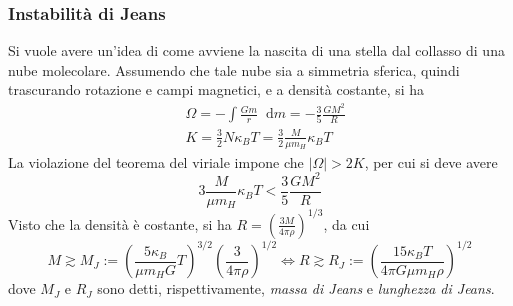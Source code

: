 \documentclass[11pt, a4paper]{scrartcl}
\theoremstyle{style}
\theoremstyle{style1}
\newcommand{\dd}{\mathop{}\!\mathrm{d}}
\numberwithin{equation}{subsection}
\begin{document}
\subsubsection{Instabilit\`a di Jeans}
Si vuole avere un'idea di come avviene la nascita di una stella dal collasso di una nube molecolare.
Assumendo che tale nube sia a simmetria sferica, quindi trascurando rotazione e campi magnetici, e a densit\`a costante, si ha
\[
\begin{split}
	&\Omega = - \int \frac{Gm}{r} \dd m = -\frac{3}{5} \frac{GM^2}{R}\\
	& K = \frac{3}{2} N \kappa _B T = \frac{3}{2} \frac{M}{\mu  m_H} \kappa _B T
\end{split}
\] 
La violazione del teorema del viriale impone che $\lvert \Omega  \rvert > 2K$, per cui si deve avere
\[
3 \frac{M }{\mu m_H} \kappa _B T < \frac{3}{5} \frac{GM^2}{R}
\] 
Visto che la densit\`a \`e costante, si ha $R = \left(\frac{3M}{4 \pi \rho }\right) ^{1 / 3}$, da cui 
\[
M \gtrsim M_J := \left(\frac{5 \kappa _B }{\mu  m_H G}T\right) ^{3 / 2} \left(\frac{3}{4 \pi \rho }\right) ^{1 / 2} \iff R\gtrsim R_J := \left(\frac{15 \kappa _B T}{4 \pi G \mu  m_H \rho }\right) ^{1 / 2}
\] 
dove $M_J$ e $R_J$ sono detti, rispettivamente, \textit{massa di Jeans} e \textit{lunghezza di Jeans}.
\end{document}
